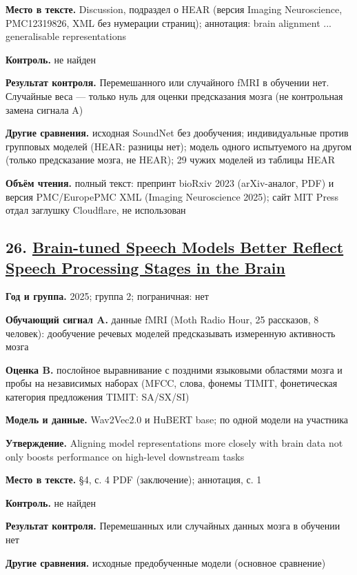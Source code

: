 \textbf{Место в тексте.} Discussion, подраздел о HEAR (версия Imaging Neuroscience, PMC12319826, XML без нумерации страниц); аннотация: brain alignment ... generalisable representations

\textbf{Контроль.} не найден

\textbf{Результат контроля.} Перемешанного или случайного fMRI в обучении нет. Случайные веса — только нуль для оценки предсказания мозга (не контрольная замена сигнала A)

\textbf{Другие сравнения.} исходная SoundNet без дообучения; индивидуальные против групповых моделей (HEAR: разницы нет); модель одного испытуемого на другом (только предсказание мозга, не HEAR); 29 чужих моделей из таблицы HEAR

\textbf{Объём чтения.} полный текст: препринт bioRxiv 2023 (arXiv-аналог, PDF) и версия PMC/EuropePMC XML (Imaging Neuroscience 2025); сайт MIT Press отдал заглушку Cloudflare, не использован


\subsection*{26. \href{https://doi.org/10.21437/interspeech.2025-2776}{Brain-tuned Speech Models Better Reflect Speech Processing Stages in the Brain}}

\textbf{Год и группа.} 2025; группа 2; пограничная: нет

\textbf{Обучающий сигнал A.} данные fMRI (Moth Radio Hour, 25 рассказов, 8 человек): дообучение речевых моделей предсказывать измеренную активность мозга

\textbf{Оценка B.} послойное выравнивание с поздними языковыми областями мозга и пробы на независимых наборах (MFCC, слова, фонемы TIMIT, фонетическая категория предложения TIMIT: SA/SX/SI)

\textbf{Модель и данные.} Wav2Vec2.0 и HuBERT base; по одной модели на участника

\textbf{Утверждение.} Aligning model representations more closely with brain data not only boosts performance on high-level downstream tasks

\textbf{Место в тексте.} §4, с. 4 PDF (заключение); аннотация, с. 1

\textbf{Контроль.} не найден

\textbf{Результат контроля.} Перемешанных или случайных данных мозга в обучении нет

\textbf{Другие сравнения.} исходные предобученные модели (основное сравнение)

